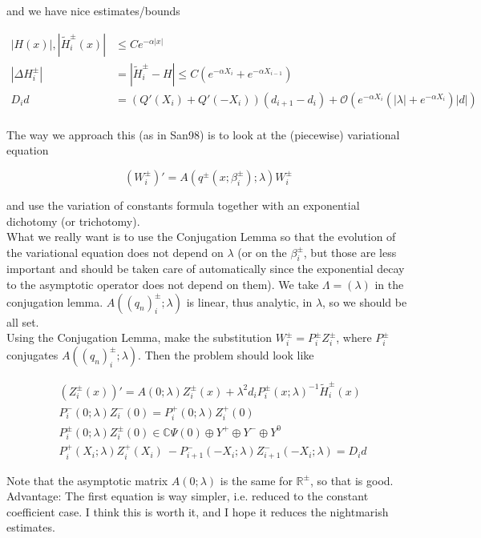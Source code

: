 \documentclass[12pt]{article}
\def\R{{\mathbb R}}
\def\C{{\mathbb C}}
\begin{document}
and we have nice estimates/bounds

\begin{align*}
|H(x)|, |\tilde{H}_i^\pm(x)| &\leq C e^{-\alpha |x|} \\
|\Delta H_i^\pm| &= |\tilde{H}_i^\pm - H| \leq C(e^{-\alpha X_i} + e^{-\alpha X_{i-1}} ) \\
D_i d &= ( Q'(X_i) + Q'(-X_i))(d_{i+1} - d_i ) + \mathcal{O} \left( e^{-\alpha X_i} \left( |\lambda| +  e^{-\alpha X_i}  \right) |d| \right) \\
\end{align*}

The way we approach this (as in San98) is to look at the (piecewise) variational equation

\[
(W_i^\pm)' = A(q^\pm(x; \beta_i^\pm); \lambda) W_i^\pm
\]

and use the variation of constants formula together with an exponential dichotomy (or trichotomy).\\

What we really want is to use the Conjugation Lemma so that the evolution of the variational equation does not depend on $\lambda$ (or on the $\beta_i^\pm$, but those are less important and should be taken care of automatically since the exponential decay to the asymptotic operator does not depend on them). We take $\Lambda = (\lambda)$ in the conjugation lemma. $A((q_n)_i^\pm; \lambda)$ is linear, thus analytic, in $\lambda$, so we should be all set.\\

Using the Conjugation Lemma, make the substitution $W_i^\pm = P_i^\pm Z_i^\pm$, where $P_i^\pm$ conjugates $A((q_n)_i^\pm; \lambda)$. Then the problem should look like

\begin{align*}
&(Z_i^\pm(x))' = A(0; \lambda) Z_i^\pm(x) + \lambda^2 d_i P_i^\pm(x; \lambda)^{-1} \tilde{H}_i^\pm(x) \\
&P_i^-(0; \lambda) Z_i^-(0) = P_i^+(0; \lambda) Z_i^+(0) \\
&P_i^\pm(0; \lambda) Z_i^\pm(0) \in \C \Psi(0) \oplus Y^+ \oplus Y^- \oplus Y^0 \\
&P_i^+(X_i; \lambda) Z_i^+(X_i)\ - P_{i+1}^-(-X_i; \lambda) Z_{i+1}^-(-X_i; \lambda) = D_i d
\end{align*}

Note that the asymptotic matrix $A(0; \lambda)$ is the same for $\R^\pm$, so that is good.\\

Advantage: The first equation is way simpler, i.e. reduced to the constant coefficient case. I think this is worth it, and I hope it reduces the nightmarish estimates.\\
\end{document}
